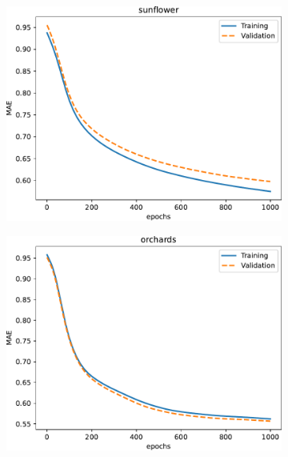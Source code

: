 \documentclass[journal,article,submit,pdftex,moreauthors]{Definitions/mdpi}
\begin{document}
\begin{figure}[H]
\begin{subfigure}[t]{0.3\textwidth}
		\includegraphics[width=\linewidth]{figures/results_040923/loss_sunflower.pdf}
	\caption{}
	\label{fig:loss_sunflower}
	\end{subfigure}\hfill
	\begin{subfigure}[t]{0.3\textwidth}
		\includegraphics[width=\linewidth]{figures/results_040923/loss_orchards.pdf}
	\caption{}
	\label{fig:loss_orchards}
	\end{subfigure}\hfill
	\begin{subfigure}[t]{0.3\textwidth}

\end{subfigure}
\end{figure}
\end{document}
